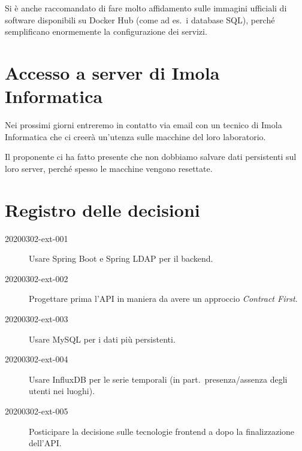 \documentclass{article}
\begin{document}
Si è anche raccomandato di fare molto affidamento sulle immagini ufficiali di software disponibili su Docker Hub (come ad es.\ i database SQL), perché semplificano enormemente la configurazione dei servizi.



\section{Accesso a server di Imola Informatica}%
\label{sec:accesso_a_server_di_imola_informatica}

Nei prossimi giorni entreremo in contatto via email con un tecnico di Imola Informatica che ci creerà un'utenza sulle macchine del loro laboratorio.

Il proponente ci ha fatto presente che non dobbiamo salvare dati persistenti sul loro server, perché spesso le macchine vengono resettate.


\newpage
\section{Registro delle decisioni}%
\label{sec:registro_delle_decisioni}

\begin{description}
  \item[20200302-ext-001] Usare Spring Boot e Spring LDAP per il backend.
  \item[20200302-ext-002] Progettare prima l'API in maniera da avere un approccio \textit{Contract First}.
  \item[20200302-ext-003] Usare MySQL per i dati più persistenti.
  \item[20200302-ext-004] Usare InfluxDB per le serie temporali (in part.\ presenza/assenza degli utenti nei luoghi).
  \item[20200302-ext-005] Posticipare la decisione sulle tecnologie frontend a dopo la finalizzazione dell'API\@.
\end{description}
\end{document}
